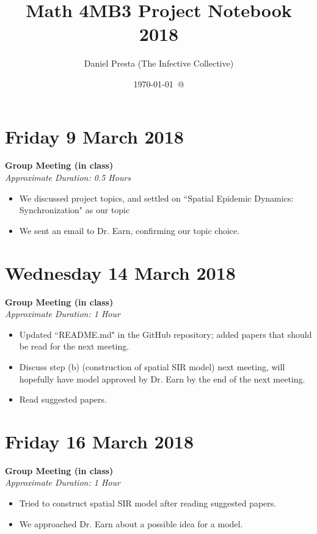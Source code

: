 \documentclass[12pt]{article}\usepackage[]{graphicx}\usepackage[]{color}
\title{Math 4MB3 Project Notebook 2018}
\author{Daniel Presta (The Infective Collective)}
\date{\today\ @ \thistime}
\begin{document}
\maketitle

\section*{Friday 9 March 2018}

\textbf{Group Meeting (in class)} \\
\emph{Approximate Duration: 0.5 Hours}

\begin{itemize}
\item We discussed project topics, and settled on ``Spatial Epidemic Dynamics: Synchronization" as our topic
\item We sent an email to Dr. Earn, confirming our topic choice.
\end{itemize}

\section*{Wednesday 14 March 2018}

\textbf{Group Meeting (in class)} \\
\emph{Approximate Duration: 1  Hour}

\begin{itemize}
\item Updated ``README.md" in the GitHub repository; added papers that should be read for the next meeting.
\item Discuss step (b) (construction of spatial SIR model) next meeting, will hopefully have model approved by Dr. Earn by the end of the next meeting.
\item Read suggested papers.
\end{itemize}

\section*{Friday 16 March 2018}

\textbf{Group Meeting (in class)} \\
\emph{Approximate Duration: 1 Hour}

\begin{itemize}
\item Tried to construct spatial SIR model after reading suggested papers.
\item We approached Dr. Earn about a possible idea for a model.
\end{itemize}
\end{document}
